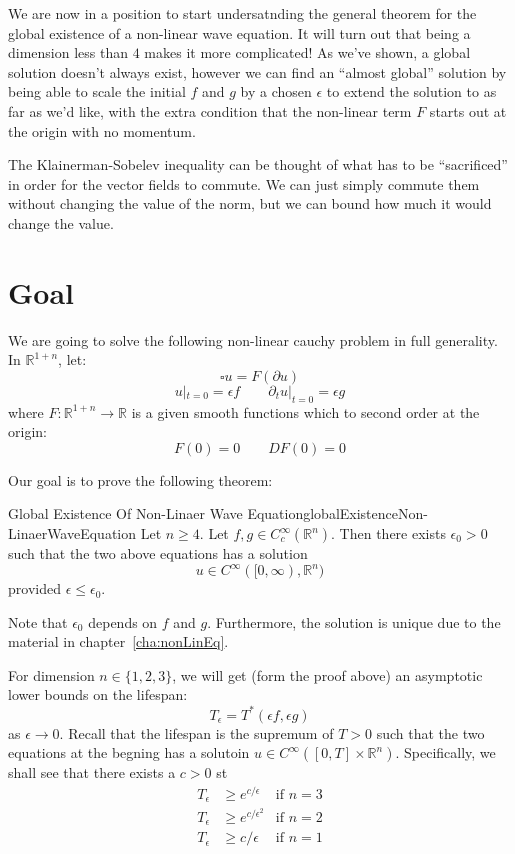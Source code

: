 \documentclass{book}
\newcommand{\R}{{\mathbb{R}}}
\newcommand{\rw}{\rightarrow}
\begin{document}
We are now in a position to start undersatnding the general theorem for the global existence of a non-linear wave
equation. It will turn out that being a dimension less than $4$ makes it more complicated! As we've shown, a global
solution doesn't always exist, however we can find an ``almost global'' solution by being able to scale the initial $f$
and $g$ by a chosen $\epsilon$ to extend the solution to as far as we'd like, with the extra condition that the
non-linear term $F$ starts out at the origin with no momentum.

The Klainerman-Sobelev inequality can be thought of what has to be ``sacrificed'' in order for the vector fields to
commute. We can just simply commute them without changing the value of the norm, but we can bound how much it would
change the value.

\section{Goal}

We are going to solve the following non-linear cauchy problem in full generality. In $\R^{1+n}$, let:
\begin{equation}\label{eq:globalExistenceI}
  \square u = F(  \partial u )
\end{equation}
\begin{equation}\label{eq:globalExistenceII}
	u|_{t = 0} = \epsilon f \qquad  \partial_t u|_{t = 0} = \epsilon g
\end{equation}
where $F: \R^{1+n} \rw \R$ is a given smooth functions which to second order at the origin:
\[
	F(0) = 0 \qquad DF(0) = 0
\]

Our goal is to prove the following theorem:
\begin{thm}{Global Existence Of Non-Linaer Wave Equation}{globalExistenceNon-LinaerWaveEquation}
	Let $n \ge 4$. Let $f,g \in C_c^\infty(\R^n)$. Then there exists $\epsilon_0 > 0$ such that the two above equations
	has a solution
	\[
		u \in C^\infty([0, \infty), \R^n)
	\]
	provided $\epsilon \le \epsilon_0$.
\end{thm}

Note that $\epsilon_0$ depends on $f$ and $g$. Furthermore, the solution is unique due to the material in
chapter~\ref{cha:nonLinEq}.

For dimension $n \in \{1,2,3\}$, we will get (form the proof above) an asymptotic lower bounds on the lifespan:
\[
	T_\epsilon = T^*(\epsilon f, \epsilon g)
\]
as $\epsilon \rw 0$. Recall that the lifespan is the supremum of $T > 0$ such that the two equations at the begning has
a solutoin $u \in C^\infty([0, T]\times \R^n)$. Specifically, we shall see that there exists a $c > 0$ st
\begin{align*}
	T_\epsilon &\ge e^{c/\epsilon} & \text{if $n = 3$}\\
	T_\epsilon &\ge e^{c/\epsilon^2} & \text{if $n = 2$}\\
	T_\epsilon &\ge c/\epsilon & \text{if $n = 1$}\\
\end{align*}
\end{document}
